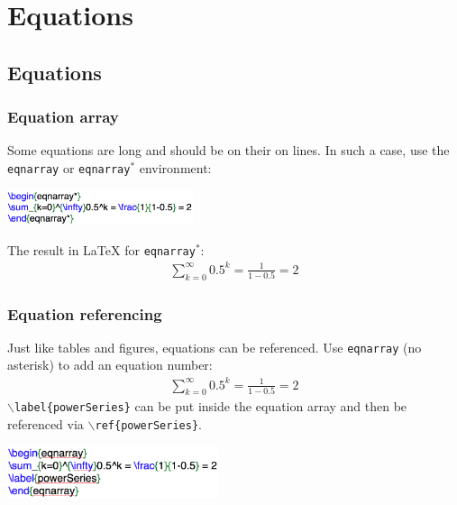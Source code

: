 \section{Equations}
\subsection{Equations}

\begin{frame} \frametitle{Equation array}
	Some equations are long and should be on their on lines. In such a case, use the \texttt{\color{highlight}eqnarray} or \texttt{\color{highlight}eqnarray$^*$} environment:
	\begin{center}
		\includegraphics[height=0.4in]{math/images/eqnarrayStar}
	\end{center}
	The result in LaTeX for \texttt{\color{highlight}eqnarray$^*$}:
	\begin{eqnarray*}
		\sum_{k=0}^{\infty}0.5^k = \frac{1}{1-0.5} = 2
	\end{eqnarray*}
\end{frame}

\begin{frame} \frametitle{Equation referencing}
	Just like tables and figures, equations can be referenced. Use \texttt{\color{highlight}eqnarray} (no asterisk) to add an equation number:
	\begin{eqnarray}
	\sum_{k=0}^{\infty}0.5^k = \frac{1}{1-0.5} = 2
	\end{eqnarray}
	\texttt{\color{command}$\backslash$label}\texttt{\color{braces}\{}\texttt{powerSeries}\texttt{\color{braces}\}} can be put inside the equation array and then be referenced via \texttt{\color{command}$\backslash$ref}\texttt{\color{braces}\{}\texttt{powerSeries}\texttt{\color{braces}\}}.
	\begin{center}
		\includegraphics[height=0.6in]{math/images/eqnarray}
	\end{center}
\end{frame}

